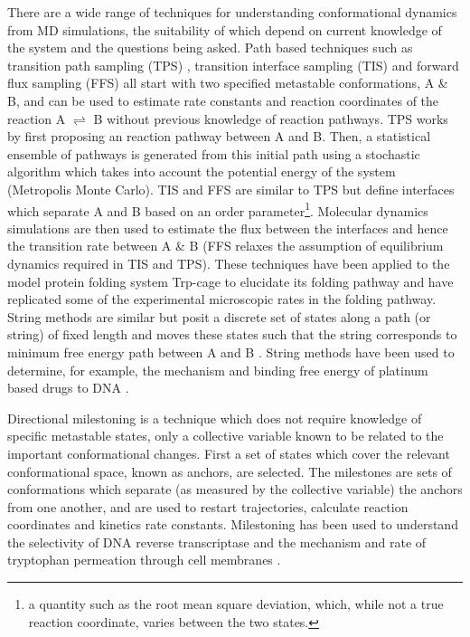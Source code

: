 There are a wide range of techniques for understanding conformational dynamics from MD simulations, the suitability of which depend on current knowledge of the system and the questions being asked. Path based techniques such as transition path sampling (TPS) \cite{bolhuisTRANSITIONPATHSAMPLING2002, dellagoTransitionPathSampling1998, dellagoTransitionPathSampling2002a}, transition interface sampling (TIS) \cite{vanerpNovelPathSampling2003} and forward flux sampling (FFS) 
\cite{allenSamplingRareSwitching2005} all start with two specified metastable conformations, A \& B, and can be used to estimate rate constants and reaction coordinates of the reaction A $\rightleftharpoons$ B without previous knowledge of reaction pathways. TPS works by first proposing an reaction pathway between A and B. Then, a statistical ensemble of pathways is generated from this initial path using a stochastic algorithm which takes into account the potential energy of the system (Metropolis Monte Carlo). TIS and FFS are similar to TPS but define interfaces which separate A and B based on an order parameter\footnote{a quantity such as the root mean square deviation, which, while not a true reaction coordinate, varies between the two states.}. Molecular dynamics simulations are then used to estimate the flux between the interfaces and hence the transition rate between A \& B (FFS relaxes the assumption of equilibrium dynamics required in TIS and TPS). These techniques have been applied \cite{juraszekSamplingMultipleFolding2006, juraszekRateConstantReaction2008,velez-vegaKineticsMechanismUnfolding2010} to the model protein folding system Trp-cage \cite{neidighDesigning20residueProtein2002} to elucidate its folding pathway and have replicated some of the experimental microscopic rates in the folding pathway. String methods are similar but posit a discrete set of states along a path (or string) of fixed length and moves these states such that the string corresponds to minimum free energy path between A and B \cite{weinane.TransitionPathTheoryPathFinding2010, jnssonNudgedElasticBand1998}. String methods have been used to determine, for example, the mechanism and binding free energy of platinum based drugs to DNA \cite{elderSequenceSpecificRecognitionCancer2012}. 

Directional milestoning \cite{faradjianComputingTimeScales2004, majekMilestoningReactionCoordinate2010,kirmizialtinRevisitingComputingReaction2011a} is a technique which does not require knowledge of specific metastable states, only a  collective variable known to be related to the important conformational changes.  First a set of states which cover the relevant conformational space, known as anchors, are selected. The milestones are sets of conformations which separate (as measured by the collective variable) the anchors from one another, and are used to restart trajectories, calculate reaction coordinates and kinetics rate constants. Milestoning has been used to understand the selectivity of DNA reverse transcriptase \cite{kirmizialtinHowConformationalDynamics2012} and the  mechanism and rate of tryptophan permeation through cell membranes \cite{cardenasUnassistedTransportAcetyl2012}.  

